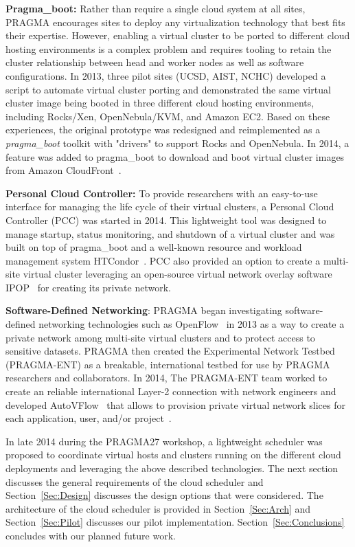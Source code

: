 \documentclass{acm_proc_article-sp}
\begin{document}
\textbf{Pragma\_boot:}  Rather than require a single cloud system at all sites, PRAGMA encourages sites to  deploy any virtualization technology that best fits their expertise. However, enabling a virtual cluster to be ported to different cloud hosting environments is a complex problem and requires tooling to retain the cluster relationship between head and worker nodes as well as software configurations.  In 2013, three pilot sites (UCSD, AIST, NCHC) developed a script to automate virtual cluster porting and demonstrated the same virtual cluster image being booted in three different cloud hosting environments, including Rocks/Xen, OpenNebula/KVM, and Amazon EC2.  Based on these experiences, the original prototype was redesigned and reimplemented as a \textit{pragma\_boot} toolkit with "drivers" to support  Rocks and OpenNebula.  In 2014, a feature was added to pragma\_boot to download and boot virtual cluster images from Amazon CloudFront~\cite{cloudfront}.

\textbf{Personal Cloud Controller:}  To provide researchers with an easy-to-use interface for managing the life cycle of their virtual clusters, a Personal Cloud Controller (PCC)  was started in 2014. This lightweight tool was designed to manage startup, status monitoring, and shutdown of a virtual cluster and was built on top of pragma\_boot and a well-known resource and workload management system HTCondor~\cite{condor}.   PCC also provided an option to create a multi-site virtual cluster leveraging an open-source virtual network overlay software IPOP~\cite{ipop} for creating its private network.  

\textbf{Software-Defined Networking}:   PRAGMA began investigating software-defined networking technologies such as OpenFlow~\cite{openflow} in 2013 as a way to create a private network among multi-site virtual clusters and to protect access to sensitive datasets.  PRAGMA then created the Experimental Network Testbed (PRAGMA-ENT) as a breakable, international testbed for use by PRAGMA researchers and collaborators.  In 2014, The PRAGMA-ENT team worked to create an reliable international Layer-2 connection with network engineers and developed AutoVFlow~\cite{autovflow} that allows to provision private virtual network slices for each application, user, and/or project~\cite{pragmaReport2014}.  

In late 2014 during the PRAGMA27 workshop, a lightweight scheduler was proposed to coordinate virtual hosts and clusters running on the different cloud deployments  and leveraging the above described technologies.  The next section discusses the general requirements of the cloud scheduler and Section~\ref{Sec:Design} discusses the design options that were considered.  The architecture of the cloud scheduler is provided in Section~\ref{Sec:Arch} and Section~\ref{Sec:Pilot} discusses our pilot implementation.  Section~\ref{Sec:Conclusions} concludes with our planned future work.  
\end{document}
